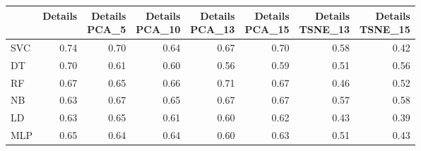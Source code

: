 \documentclass[12pt,italian]{report}
\begin{document}
\begin{table}[h]
	\begin{center}
		\begin{adjustbox}{max width=\textwidth, max totalheight= {4cm}}
			\begin{tabular}{lrrrrrrr}
				\toprule
				{} &   Details &  \thead{Details\\PCA\_5} &  \thead{Details\\PCA\_10} &  \thead{Details\\PCA\_13} &  \thead{Details\\PCA\_15} &  \thead{Details\\TSNE\_13} &  \thead{Details\\TSNE\_15} \\
				\midrule
				SVC &  0.74 &                  0.70 &                   0.64 &                   0.67 &                   0.70 &                    0.58 &                    0.42 \\
				DT  &  \cellcolor{cyan}0.70 &                  0.61 &                   0.60 &                   0.56 &                   0.59 &                    0.51 &                    0.56 \\
				RF  &  0.67 &                  0.65 &                   0.66 &                   \cellcolor{cyan}0.71 &                   0.67 &                    0.46 &                    0.52 \\
				NB  &  0.63 &                  0.67 &                   0.65 &                   0.67 &                   0.67 &                    0.57 &                    0.58 \\
				LD  &  0.63 &                  0.65 &                   0.61 &                   0.60 &                   0.62 &                    0.43 &                    0.39 \\
				MLP &  0.65 &                  0.64 &                   0.64 &                   0.60 &                   0.63 &                    0.51 &                    0.43 \\
				\bottomrule
			\end{tabular}
		\end{adjustbox}
	\end{center}
\end{table}
\end{document}
